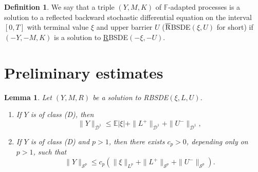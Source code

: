 \documentclass[11pt,a4paper,reqno]{amsart}
\newtheorem{lemma}[theorem]{\bf Lemma}
\theoremstyle{definition}
\newtheorem{definition}[theorem]{Definition}
\numberwithin{equation}{section}
\begin{document}
\begin{definition}
We say that a triple $(Y,M,K)$ of $\mathbb{F}$-adapted processes is a solution to  a reflected 
backward stochastic differential equation on the interval $[0,T]$ with  terminal value $\xi$ and upper  barrier $U$ 
($\rm{\overline{R}}$BSDE$(\xi,U)$ for short) 
if $(-Y,-M,K)$ is a solution to \underline{R}BSDE$(-\xi,-U)$.
\end{definition}


\section{Preliminary estimates}\label{sec.prelim.var}

\begin{lemma}
\label{24marca1}
Let $(Y,M,R)$ be a solution to \textnormal{RBSDE}$(\xi,L,U)$.
\begin{enumerate}
\item[(i)] If  $Y$ is of class \textnormal{(D)}, then
\begin{equation}\label{24marca2}
\|Y\|_{\mathcal{D}^1}\le \mathbb E|\xi|+\|L^+\|_{\mathcal{D}^1}+\|U^-\|_{\mathcal{D}^1},
\end{equation}
\item[(ii)] If   $Y$ is of class \textnormal{(D)} and  $p>1$, then  there exists $c_p>0$, 
depending only on $p> 1$, such that
\begin{equation}\label{24marca3}
\|Y\|_{\mathcal{S}^p}\le c_p (\|\xi\|_{L^p}+\|L^+\|_{\mathcal{S}^p}+\|U^-\|_{\mathcal{S}^p}).
\end{equation}
\end{enumerate}
\end{lemma}
\end{document}

